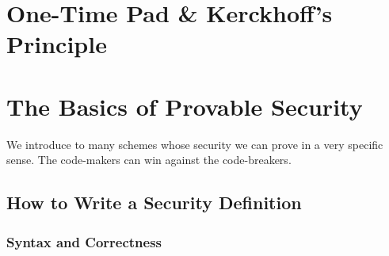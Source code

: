 \documentclass[12pt,openany]{book}
\theoremstyle{definition}
\begin{document}
	\chapter*{One-Time Pad \& Kerckhoff's Principle}
	
	\chapter{The Basics of Provable Security}
	
	We introduce to many schemes whose security we can prove in a very specific sense. The code-makers can win against the code-breakers.
	
	\section{How to Write a Security Definition}
	\subsection{Syntax and Correctness}
	
\end{document}
